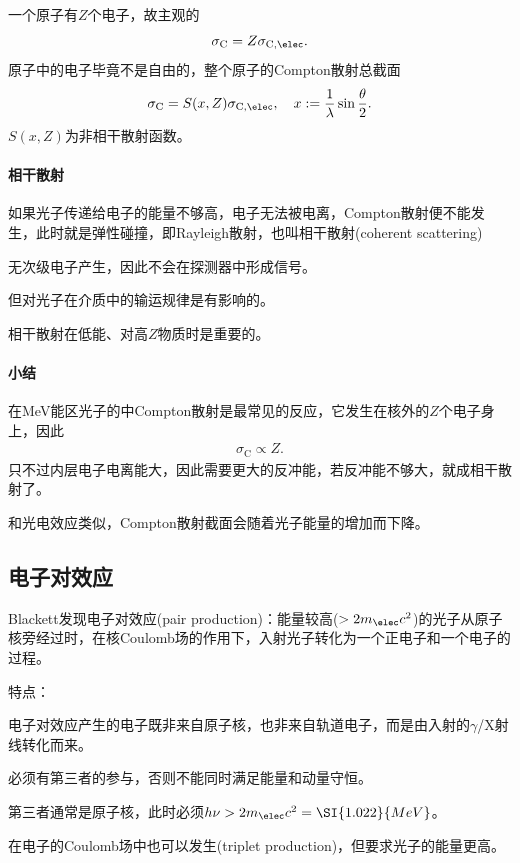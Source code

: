 一个原子有$Z$个电子，故主观的
\[
	\sigma_\mathrm C=Z\sigma_{\mathrm C,\elec}.
\]
原子中的电子毕竟不是自由的，整个原子的Compton散射总截面
\begin{align}
	\sigma_\mathrm C=S(x,Z)\sigma_{\mathrm C,\elec},\quad x:=\frac1\lambda\sin\frac\theta{2}.
\end{align}
$S(x,Z)$为非相干散射函数。
\paragraph{相干散射}
如果光子传递给电子的能量不够高，电子无法被电离，Compton散射便不能发生，此时就是弹性碰撞，即Rayleigh散射，也叫相干散射(coherent scattering)
\begin{compactenum}
	\item 无次级电子产生，因此不会在探测器中形成信号。
	\item 但对光子在介质中的输运规律是有影响的。
	\item 相干散射在低能、对高$Z$物质时是重要的。
\end{compactenum}
\paragraph{小结}在MeV能区光子的中Compton散射是最常见的反应，它发生在核外的$Z$个电子身上，因此
\begin{align}
	\sigma_\mathrm C\propto Z.
\end{align}
只不过内层电子电离能大，因此需要更大的反冲能，若反冲能不够大，就成相干散射了。

和光电效应类似，Compton散射截面会随着光子能量的增加而下降。

\subsection{电子对效应}

Blackett发现电子对效应(pair production)：能量较高($>2m_\elec c^2$)的光子从原子核旁经过时，在核Coulomb场的作用下，入射光子转化为一个正电子和一个电子的过程。

特点：
\begin{compactenum}
	\item 电子对效应产生的电子既非来自原子核，也非来自轨道电子，而是由入射的$\gamma$/X射线转化而来。
	\item 必须有第三者的参与，否则不能同时满足能量和动量守恒。
	\item 第三者通常是原子核，此时必须$h\nu>2m_\elec c^2=\SI{1.022}{MeV}$。
	\item 在电子的Coulomb场中也可以发生(triplet production)，但要求光子的能量更高。
\end{compactenum}


